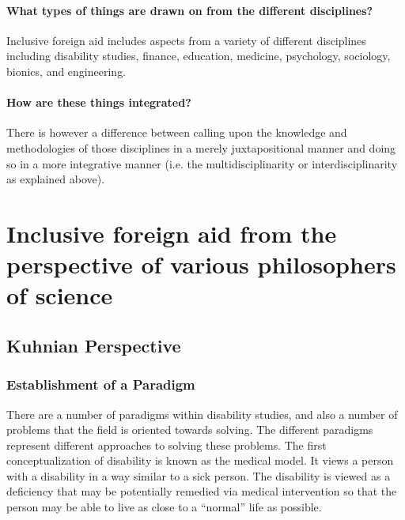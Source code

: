 \documentclass[a4paper]{article}
\begin{document}
\paragraph{What types of things are drawn on from the different disciplines?}

Inclusive foreign aid includes aspects from a variety of different disciplines
including disability studies, finance, education, medicine, psychology,
sociology, bionics, and engineering. 

\paragraph{How are these things integrated?}

There is however a difference between calling upon the knowledge and
methodologies of those disciplines in a merely juxtapositional manner and
doing so in a more integrative manner (i.e. the multidisciplinarity or
interdisciplinarity as explained above).

\newpage
\section{Inclusive foreign aid from the perspective of various philosophers of
science}

\subsection{Kuhnian Perspective}

\subsubsection{Establishment of a Paradigm}

There are a number of paradigms within disability studies, and also a number
of problems that the field is oriented towards solving. The different
paradigms represent different approaches to solving these problems. The first
conceptualization of disability is known as the medical model. It views a
person with a disability in a way similar to a sick person. The disability is
viewed as a deficiency that may be potentially remedied via medical
intervention so that the person may be able to live as close to a ``normal''
life as possible. 
\end{document}
